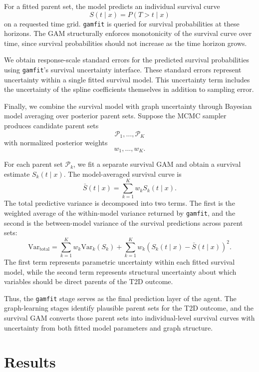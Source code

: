 \documentclass[11pt]{article}
\begin{document}
For a fitted parent set, the model predicts an individual survival curve
\[
S(t \mid x) = P(T > t \mid x)
\]
on a requested time grid. \texttt{gamfit} is queried for survival probabilities at these horizons. The GAM structurally enforces monotonicity of the survival curve over time, since survival probabilities should not increase as the time horizon grows.

We obtain response-scale standard errors for the predicted survival probabilities using \texttt{gamfit}'s survival uncertainty interface. These standard errors represent uncertainty within a single fitted survival model. This uncertainty term includes the uncertainty of the spline coefficients themselves in addition to sampling error.

Finally, we combine the survival model with graph uncertainty through Bayesian model averaging over posterior parent sets. Suppose the MCMC sampler produces candidate parent sets
\[
\mathcal{P}_1,\ldots,\mathcal{P}_K
\]
with normalized posterior weights
\[
w_1,\ldots,w_K.
\]

For each parent set $\mathcal{P}_k$, we fit a separate survival GAM and obtain a survival estimate $S_k(t \mid x)$. The model-averaged survival curve is
\[
\bar{S}(t \mid x)
=
\sum_{k=1}^K w_k S_k(t \mid x).
\]
The total predictive variance is decomposed into two terms. The first is the weighted average of the within-model variance returned by \texttt{gamfit}, and the second is the between-model variance of the survival predictions across parent sets:
\[
\mathrm{Var}_{\text{total}}
=
\sum_{k=1}^K w_k \mathrm{Var}_k(S_k)
+
\sum_{k=1}^K w_k
\left(S_k(t \mid x) - \bar{S}(t \mid x)\right)^2.
\]
The first term represents parametric uncertainty within each fitted survival model, while the second term represents structural uncertainty about which variables should be direct parents of the T2D outcome.

Thus, the \texttt{gamfit} stage serves as the final prediction layer of the agent. The graph-learning stages identify plausible parent sets for the T2D outcome, and the survival GAM converts those parent sets into individual-level survival curves with uncertainty from both fitted model parameters and graph structure.


\section{Results}
\end{document}
